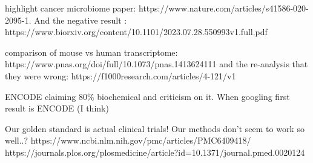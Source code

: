 highlight cancer microbiome paper: https://www.nature.com/articles/s41586-020-2095-1. And the negative result : https://www.biorxiv.org/content/10.1101/2023.07.28.550993v1.full.pdf

comparison of mouse vs human transcriptome: https://www.pnas.org/doi/full/10.1073/pnas.1413624111 and the re-analysis that they were wrong: https://f1000research.com/articles/4-121/v1

ENCODE claiming 80\% biochemical and criticism on it. When googling first result is ENCODE (I think)

Our golden standard is actual clinical trials! Our methods don't seem to work so well..?
https://www.ncbi.nlm.nih.gov/pmc/articles/PMC6409418/
https://journals.plos.org/plosmedicine/article?id=10.1371/journal.pmed.0020124

